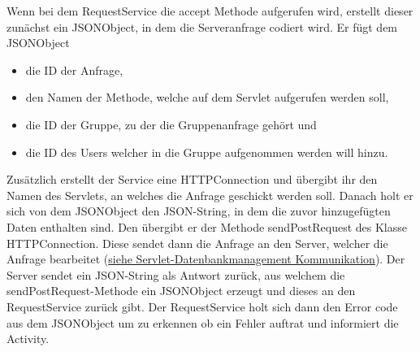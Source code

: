 Wenn bei dem RequestService die accept Methode aufgerufen wird, erstellt dieser zunächst ein JSONObject, in dem die Serveranfrage codiert wird. Er fügt dem JSONObject
\begin{itemize}
\item  die ID der Anfrage,
\item den Namen der Methode, welche auf dem Servlet aufgerufen werden soll,
\item die ID der Gruppe, zu der die Gruppenanfrage gehört und
\item die ID des Users welcher in die Gruppe aufgenommen werden will hinzu.
\end{itemize}
Zusätzlich erstellt der Service eine HTTPConnection und übergibt ihr den Namen des Servlets, an welches die Anfrage geschickt werden soll.
Danach holt er sich von dem JSONObject den JSON-String, in dem die zuvor hinzugefügten Daten enthalten sind. Den übergibt er der Methode sendPostRequest des Klasse HTTPConnection.
Diese sendet dann die Anfrage an den Server, welcher die Anfrage bearbeitet (\hyperlink{ServletDatenbank}{siehe Servlet-Datenbankmanagement Kommunikation}). Der Server sendet ein JSON-String als Antwort zurück, aus welchem die sendPostRequest-Methode ein JSONObject erzeugt und dieses an den RequestService zurück gibt. Der RequestService holt sich dann den Error code aus dem JSONObject um zu erkennen ob ein Fehler auftrat und informiert die Activity.



\hypertarget{ServletDatenbank}{}
